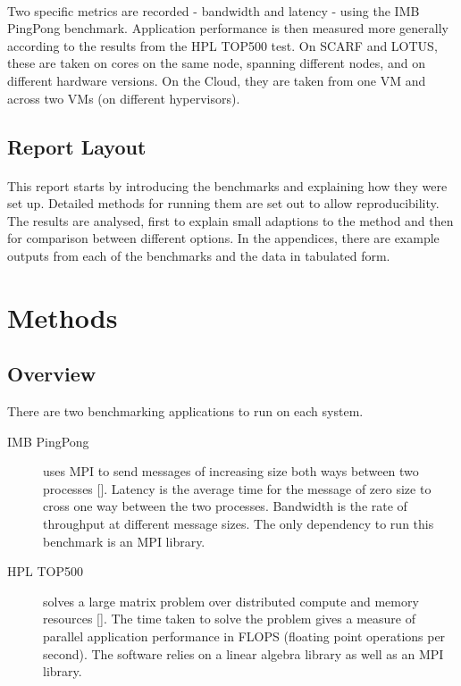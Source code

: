 \documentclass{article}
\begin{document}
        \paragraph{}
        Two specific metrics are recorded - bandwidth and latency - using the IMB PingPong benchmark. Application performance is then measured more generally according to the results from the HPL TOP500 test. On SCARF and LOTUS, these are taken on cores on the same node, spanning different nodes, and on different hardware versions. On the Cloud, they are taken from one VM and across two VMs (on different hypervisors).

    \subsection{Report Layout}
        \paragraph{}
        This report starts by introducing the benchmarks and explaining how they were set up. Detailed methods for running them are set out to allow reproducibility. The results are analysed, first to explain small adaptions to the method and then for comparison between different options. In the appendices, there are example outputs from each of the benchmarks and the data in tabulated form.

\section{Methods}

    \subsection{Overview}
    \label{overview-of-methods}
    There are two benchmarking applications to run on each system.

    \begin{description}
        \item[IMB PingPong] uses MPI to send messages of increasing size both ways between two processes [\cite{intel2016}]. Latency is the average time for the message of zero size to cross one way between the two processes. Bandwidth is the rate of throughput at different message sizes. The only dependency to run this benchmark is an MPI library.
        \item[HPL TOP500] solves a large matrix problem over distributed compute and memory resources [\cite{hpl2016}]. The time taken to solve the problem gives a measure of parallel application performance in FLOPS (floating point operations per second). The software relies on a linear algebra library as well as an MPI library.
    \end{description}
\end{document}
